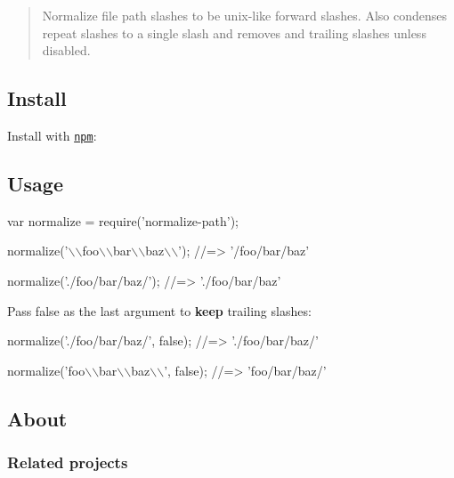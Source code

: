 \begin{quote}
Normalize file path slashes to be unix-\/like forward slashes. Also condenses repeat slashes to a single slash and removes and trailing slashes unless disabled. \end{quote}


\subsection*{Install}

Install with \href{https://www.npmjs.com/}{\tt npm}\+:




\subsection*{Usage}


\begin{DoxyCode}
var normalize = require('normalize-path');

normalize('\(\backslash\)\(\backslash\)foo\(\backslash\)\(\backslash\)bar\(\backslash\)\(\backslash\)baz\(\backslash\)\(\backslash\)');
//=> '/foo/bar/baz'

normalize('./foo/bar/baz/');
//=> './foo/bar/baz'
\end{DoxyCode}


Pass {\ttfamily false} as the last argument to {\bfseries keep} trailing slashes\+:


\begin{DoxyCode}
normalize('./foo/bar/baz/', false);
//=> './foo/bar/baz/'

normalize('foo\(\backslash\)\(\backslash\)bar\(\backslash\)\(\backslash\)baz\(\backslash\)\(\backslash\)', false);
//=> 'foo/bar/baz/'
\end{DoxyCode}


\subsection*{About}

\subsubsection*{Related projects}



